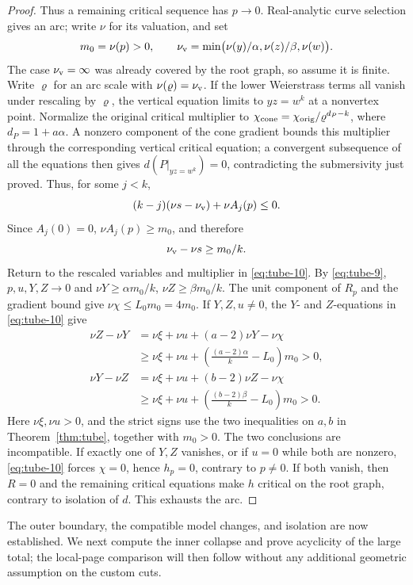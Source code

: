 \begin{proof}
Thus a remaining critical sequence has \(p\to0\).
Real-analytic curve selection gives an arc; write
\(\nu\) for its valuation, and set
\[
m_0=\nu(p)>0,\qquad
\nu_{\rm v}=\min\bigl(\nu(y)/\alpha,\nu(z)/\beta,\nu(w)\bigr).
\]
The case \(\nu_{\rm v}=\infty\) was already covered by the root graph,
so assume it is finite. Write \(\varrho\) for an arc scale with
\(\nu(\varrho)=\nu_{\rm v}\).
If the lower Weierstrass terms all vanish under rescaling by
\(\varrho\), the vertical equation limits to \(yz=w^k\) at a
nonvertex point. Normalize the original critical multiplier to
\(\chi_{\rm cone}=\chi_{\rm orig}/\varrho^{d_P-k}\), where \(d_P=1+a\alpha\).
A nonzero component of the cone gradient
bounds this multiplier through the corresponding vertical
critical equation; a convergent subsequence of all the equations
then gives \(d(P|_{yz=w^k})=0\), contradicting the
submersivity just proved. Thus, for some \(j<k\),
\begin{equation}
(k-j)(\nu s-\nu_{\rm v})+\nu A_j(p)\le0.
\label{eq:tube-8}
\end{equation}
Since \(A_j(0)=0\), \(\nu A_j(p)\ge m_0\), and therefore
\begin{equation}
\nu_{\rm v}-\nu s\ge m_0/k.
\label{eq:tube-9}
\end{equation}
Return to the rescaled variables and multiplier in \eqref{eq:tube-10}.
By \eqref{eq:tube-9}, \(p,u,Y,Z\to0\) and
\(\nu Y\ge\alpha m_0/k\), \(\nu Z\ge\beta m_0/k\).
The unit component of \(R_p\) and the gradient bound give
\(\nu\chi\le L_0m_0=4m_0\).
If \(Y,Z,u\ne0\), the \(Y\)- and \(Z\)-equations in
\eqref{eq:tube-10} give
\begin{align*}
\nu Z-\nu Y
 &=\nu\xi+\nu u+(a-2)\nu Y-\nu\chi\\
 &\ge \nu\xi+\nu u+
 \left(\frac{(a-2)\alpha}{k}-L_0\right)m_0>0,\\
\nu Y-\nu Z
 &=\nu\xi+\nu u+(b-2)\nu Z-\nu\chi\\
 &\ge \nu\xi+\nu u+
 \left(\frac{(b-2)\beta}{k}-L_0\right)m_0>0.
\end{align*}
Here \(\nu\xi,\nu u>0\), and the strict signs use the two
inequalities on \(a,b\) in Theorem~\ref{thm:tube}, together with
\(m_0>0\). The two conclusions are incompatible.
If exactly one of \(Y,Z\) vanishes, or if \(u=0\) while both
are nonzero, \eqref{eq:tube-10} forces \(\chi=0\), hence \(h_p=0\), contrary
to \(p\ne0\). If both vanish, then \(R=0\) and the remaining
critical equations make \(h\) critical on the root graph,
contrary to isolation of \(d\). This exhausts the arc.
\end{proof}

The outer boundary, the compatible model changes, and isolation are
now established. We next compute the inner collapse and prove acyclicity
of the large total; the local-page comparison will then follow without
any additional geometric assumption on the custom cuts.
